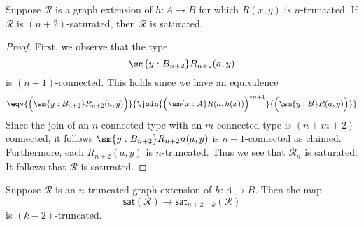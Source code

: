 \begin{thm}\label{thm:sat_trunc}
Suppose $\mathcal{R}$ is a graph extension of $h:A\to B$ for which $R(x,y)$ is $n$-truncated. If $\mathcal{R}$ is $(n+2)$-saturated, then $\mathcal{R}$ is saturated.
\end{thm}

\begin{proof}
First, we observe that the type
\begin{equation*}
\sm{y:B_{n+2}}R_{n+2}(a,y)
\end{equation*}
is $(n+1)$-connected. This holds since we have an equivalence
\begin{equation*}
\eqv{\Big(\sm{y:B_{n+2}}R_{n+2}(a,y)\Big)}{\join{\Big(\sm{x:A}R(a,h(x))\Big)^{\ast n+1}}{\Big(\sm{y:B}R(a,y)\Big)}}
\end{equation*}
Since the join of an $n$-connected type with an $m$-connected type is $(n+m+2)$-connected, it follows $\sm{y:B_{n+2}}R_{n+2}n(a,y)$ is $n+1$-connected as claimed. Furthermore, each $R_{n+2}(a,y)$ is $n$-truncated. Thus we see that $\mathcal{R}_n$ is saturated. It follows that $\mathcal{R}$ is saturated.
\end{proof}

\begin{conj}
Suppose $\mathcal{R}$ is an $n$-truncated graph extension of $h:A\to B$. Then the map
\begin{equation*}
\mathsf{sat}(\mathcal{R})\to \mathsf{sat}_{n+2-k}(\mathcal{R})
\end{equation*}
is $(k-2)$-truncated.
\end{conj}

